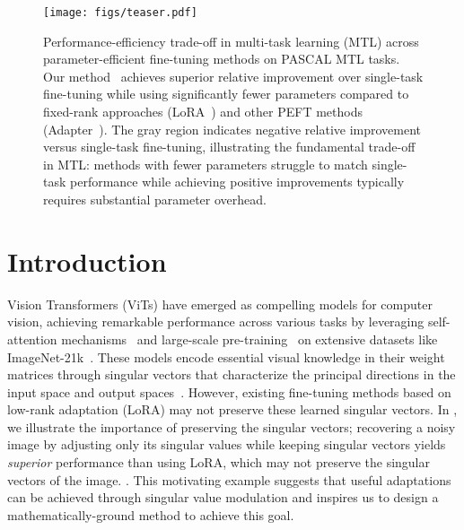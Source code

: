 \begin{figure}[!t]
    \centering
\texttt{[image: figs/teaser.pdf]}
    \caption{Performance-efficiency trade-off in multi-task learning (MTL) across parameter-efficient fine-tuning methods on PASCAL MTL tasks. Our method \ourmethod\ achieves superior relative improvement over single-task fine-tuning while using significantly fewer parameters compared to fixed-rank approaches (LoRA~\citep{hu2022lora}) and other PEFT methods (Adapter~\citep{houlsby2019parameterefficienttransferlearningnlp}). The gray region indicates negative relative improvement versus single-task fine-tuning, illustrating the fundamental trade-off in MTL: methods with fewer parameters struggle to match single-task performance while achieving positive improvements typically requires substantial parameter overhead.
    }
    \label{fig:teaser}
\end{figure}

\section{Introduction}
\label{sec:intro}
Vision Transformers (ViTs) have emerged as compelling models for computer vision, achieving remarkable performance across various tasks by leveraging self-attention mechanisms~\citep{vaswani2017attention,dosovitskiy2021an} and large-scale pre-training~\citep{steiner2021train, russakovsky2015imagenet} on extensive datasets like ImageNet-21k~\citep{deng2009imagenet}. These models encode essential visual knowledge in their weight matrices through singular vectors that characterize the principal directions in the input space and output spaces~\citep{NEURIPS2018_a7a3d70c, saxe2014exactsolutionsnonlineardynamics}.
However, existing fine-tuning methods based on low-rank adaptation (LoRA) \cite{hu2022lora, agiza2024mtlora} may not preserve these learned singular vectors. In , we illustrate the importance of preserving the singular vectors; recovering a noisy image by adjusting only its singular values while keeping singular vectors yields \emph{superior} performance than using LoRA, which may not preserve the singular vectors of the image.  . This motivating example suggests that useful adaptations can be achieved through singular value modulation and inspires us to design a mathematically-ground method to achieve this goal.

